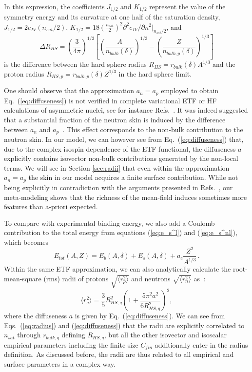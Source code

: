 \documentclass
[aps,prc,twocolumn,showpacs,showkeys,amsmath,floatfix,superscriptaddress]{revtex4}
\begin{document}
{In this expression, the coefficients $J_{1/2}$ and $K_{1/2}$ represent the value of the symmetry energy and its curvature at one half of the saturation density, 
$J_{1/2}=2e_{IV}( n_{sat}/2)$,
$K_{1/2}=18(\frac{ n_{sat}}{2})^2\partial^2 e_{IV}/\partial  n^2 |_{ n_{sat}/2}$, and 
%
\begin{equation}
\Delta R_{HS}=\left (\frac{3}{4\pi}\right )^{1/3} 
\left [\left (\frac{A}{ n_{bulk}(\delta)}\right )^{1/3}-\left (\frac{Z}{ n_{bulk, p}(\delta)}\right )^{1/3}\right ] \label{eq:rhs}
\end{equation}
%
 is the difference between the hard sphere radius $R_{HS}=r_{bulk}(\delta)A^{1/3}$ and the proton radius $R_{HS,p}=r_{bulk, p}(\delta)Z^{1/3}$  in the hard sphere limit.

{One should observe that the approximation $a_n=a_p$ employed to obtain Eq.~(\ref{eq:diffuseness}) is not verified in complete variational ETF or HF calculations of asymmetric nuclei, see for instance Refs.~\cite{centelles13,danielewicz17}.
It was indeed suggested that a substantial fraction of the neutron skin is induced by the difference between $a_n$ and $a_p$~\cite{warda09,centelles10,centelles13}.
This effect corresponds to the non-bulk contribution to the neutron skin.
In our model, we can however see from Eq.~(\ref{eq:diffuseness}) that, due to the complex isospin dependence of the ETF functional, the diffuseness $a$ explicitly contains isovector non-bulk contributions generated by the non-local terms.
We will see in Section \ref{sec:radii} that  even within the approximation $a_n=a_p$ the skin in our model acquires a finite surface contribution.
While not being explicitly in contradiction with the arguments presented in Refs.~\cite{warda09,centelles10,centelles13}, our meta-modeling shows that the richness
of the mean-field induces sometimes more features than a-priori expected.}


To compare with experimental binding energy, we also add a Coulomb contribution to the total energy from equations (\ref{eq:e_s^l}) and (\ref{eq:e_s^nl}), which becomes 
\begin{equation}
E_{tot}(A,Z)=E_b(A,\delta)+E_s(A,\delta)+ a_c\frac{Z^2}{A^{1/3}}\label{eq:binding} \, .
\end{equation}
Within the same ETF approximation, we can also analytically calculate the root-mean-square (rms) radii of protons $\sqrt{ \langle r_p^2 \rangle}$ and neutrons $\sqrt{ \langle r_n^2 \rangle}$  as~\cite{centelles10,Panagiota}:
%
\begin{equation}
\langle r_q^2 \rangle= \frac{3}{5} R_{HS,q}^2
 \left ( 1+ \frac{5\pi^2 a^2}{6 R_{HS,q}^2} \right )^2, \label{eq:radius}
\end{equation}
%
where the diffuseness $a$ is given by Eq.~(\ref{eq:diffuseness}).
We can see from Eqs.~(\ref{eq:radius}) and (\ref{eq:diffuseness}) that
the radii are  explicitly correlated to $ n_{sat}$ through $r_{bulk, q}$ defining $R_{HS, q}$, but all the other isovector and isoscalar empirical parameters 
including the finite size $C_{fin}$ additionally enter in the radius definition.
{As discussed before, the radii are thus related to all empirical and surface parameters in a complex way.}

}
\end{document}
